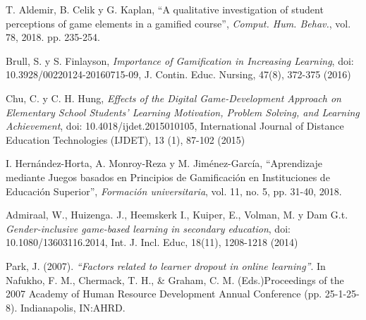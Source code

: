 \begin{thebibliography}{9}
        T. Aldemir, B. Celik y G. Kaplan, 
        ``A qualitative investigation of student perceptions of game elements in a gamified course'',
        \textit{Comput. Hum. Behav.}, vol. 78, 2018. pp. 235-254.
        
        Brull, S. y S. Finlayson, 
        \textit{Importance of Gamification in Increasing Learning},
        doi: 10.3928/00220124-20160715-09,
        J. Contin. Educ. Nursing, 47(8), 372-375 (2016)
    
        Chu, C. y C. H. Hung, 
        \textit{Effects of the Digital Game-Development Approach on Elementary School Students’
        Learning Motivation, Problem Solving, and Learning Achievement}, doi: 10.4018/ijdet.2015010105,
        International Journal of Distance Education Technologies (IJDET), 13 (1), 87-102 (2015)
        
        I. Hernández-Horta, A. Monroy-Reza y M. Jiménez-García,   
        ``Aprendizaje mediante Juegos basados en Principios de Gamificación en Instituciones de Educación Superior'',
        \textit{Formación universitaria}, vol. 11, no. 5, pp. 31-40, 2018.
        
        Admiraal, W., Huizenga. J., Heemskerk I., Kuiper, E., Volman, M. y Dam G.t.
        \textit{Gender-inclusive game-based learning in secondary education},
        doi: 10.1080/13603116.2014, Int. J. Incl. Educ, 18(11), 1208-1218 (2014)
        

    
        Park, J. (2007).
        {\it ``Factors related to learner dropout in online learning''}. In Nafukho, F. M., Chermack, T. H., \& Graham, C. M.
        (Eds.)Proceedings of the 2007 Academy of Human Resource Development Annual Conference (pp. 25-1-25-8). Indianapolis, IN:AHRD.
    

\end{thebibliography}
